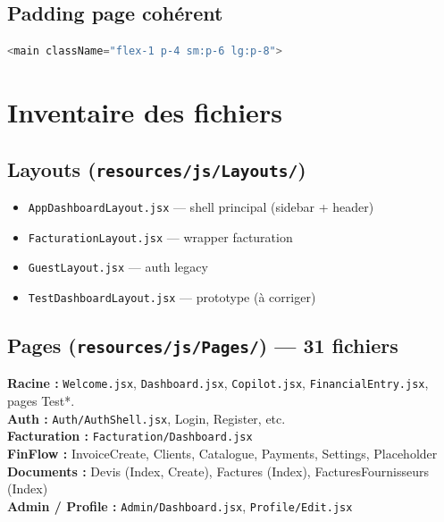 \documentclass[11pt,a4paper]{report}
\newcommand{\filepath}[1]{\texttt{\small #1}}
\begin{document}
\section{Padding page cohérent}

\begin{lstlisting}[language=Java]
<main className="flex-1 p-4 sm:p-6 lg:p-8">
\end{lstlisting}

\chapter{Inventaire des fichiers}

\section{Layouts (\filepath{resources/js/Layouts/})}

\begin{itemize}[leftmargin=1.5em]
    \item \filepath{AppDashboardLayout.jsx} — shell principal (sidebar + header)
    \item \filepath{FacturationLayout.jsx} — wrapper facturation
    \item \filepath{GuestLayout.jsx} — auth legacy
    \item \filepath{TestDashboardLayout.jsx} — prototype (à corriger)
\end{itemize}

\section{Pages (\filepath{resources/js/Pages/}) — 31 fichiers}

\textbf{Racine :} \filepath{Welcome.jsx}, \filepath{Dashboard.jsx}, \filepath{Copilot.jsx}, \filepath{FinancialEntry.jsx}, pages Test*.\\
\textbf{Auth :} \filepath{Auth/AuthShell.jsx}, Login, Register, etc.\\
\textbf{Facturation :} \filepath{Facturation/Dashboard.jsx}\\
\textbf{FinFlow :} InvoiceCreate, Clients, Catalogue, Payments, Settings, Placeholder\\
\textbf{Documents :} Devis (Index, Create), Factures (Index), FacturesFournisseurs (Index)\\
\textbf{Admin / Profile :} \filepath{Admin/Dashboard.jsx}, \filepath{Profile/Edit.jsx}
\end{document}

